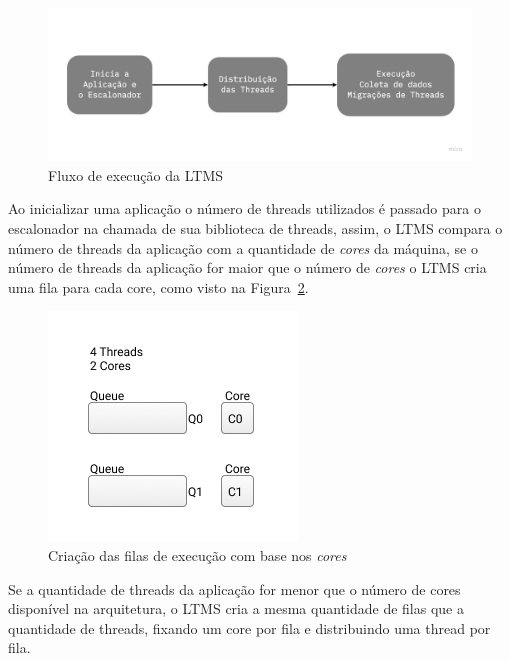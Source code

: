 \documentclass[diss,capa]{texufpel}
\begin{document}
\begin{figure}[htbp]
\centering \includegraphics[scale=.25]{images/ltms_generic}
\caption{Fluxo de execução da LTMS}
\label{ltms_generic}
\end{figure}

Ao inicializar uma aplicação o número de threads utilizados é passado para o escalonador na chamada de sua biblioteca de threads, assim, o LTMS compara o número de threads da aplicação com a quantidade de \emph{cores} da máquina, se o número de threads da aplicação for maior que o número de \emph{cores} o LTMS cria uma fila para cada core, como visto na Figura~\ref{queue_core}.

\begin{figure}[htbp]
\centering
\includegraphics[scale=.65]{images/Queue_core.png}
\caption{Criação das filas de execução com base nos \emph{cores}}
\label{queue_core}
\end{figure}

Se a quantidade de threads da aplicação for menor que o número de cores disponível na arquitetura, o LTMS cria a mesma quantidade de filas que a quantidade de threads, fixando um core por fila e distribuindo uma thread por fila.

\end{document}
